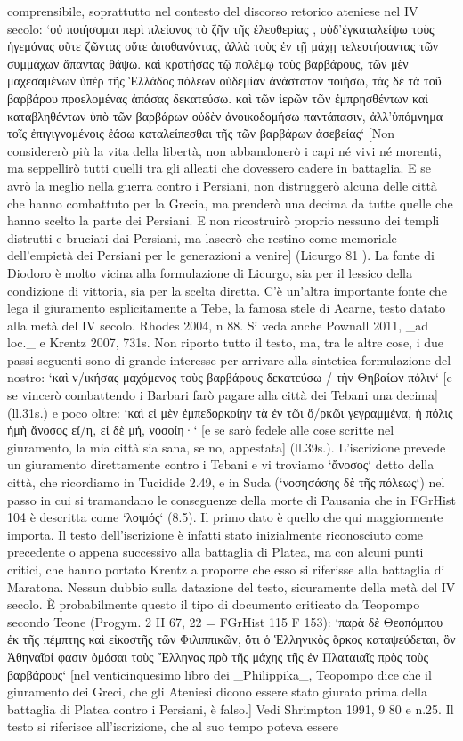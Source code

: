 comprensibile, soprattutto nel contesto del discorso retorico ateniese nel IV secolo: `οὐ ποιήσομαι περὶ πλείονος τὸ ζῆν τῆς ἐλευθερίας , οὐδ’ἐγκαταλείψω τοὺς ἡγεμόνας οὔτε ζῶντας οὔτε ἀποθανόντας, ἀλλὰ τοὺς ἐν τῇ μάχῃ τελευτήσαντας τῶν συμμάχων ἅπαντας θάψω. καὶ κρατήσας τῷ πολέμῳ τοὺς βαρβάρους, τῶν μὲν μαχεσαμένων ὑπὲρ τῆς Ἑλλάδος πόλεων οὑδεμίαν ἀνάστατον ποιήσω, τὰς δὲ τὰ τοῦ βαρβάρου προελομένας ἁπάσας δεκατεύσω. καὶ τῶν ἱερῶν τῶν ἐμπρησθέντων καὶ καταβληθέντων ὑπὸ τῶν βαρβάρων οὐδὲν ἀνοικοδομήσω παντάπασιν, ἀλλ’ὑπόμνημα τοῖς ἐπιγιγνομένοις ἐάσω καταλείπεσθαι τῆς τῶν βαρβάρων ἀσεβείας` [Non considererò più la vita della libertà, non abbandonerò i capi né vivi né morenti, ma seppellirò tutti quelli tra gli alleati che dovessero cadere in battaglia. E se avrò la meglio nella guerra contro i Persiani, non distruggerò alcuna delle città che hanno combattuto per la Grecia, ma prenderò una decima da tutte quelle che hanno scelto la parte dei Persiani. E non ricostruirò proprio nessuno dei templi distrutti e bruciati dai Persiani, ma lascerò che restino come memoriale dell'empietà dei Persiani per le generazioni a venire] (Licurgo 81 ). La fonte di  Diodoro è molto vicina alla formulazione  di Licurgo, sia per il lessico della condizione di vittoria, sia per la scelta diretta. C'è un'altra importante fonte che lega il giuramento esplicitamente a Tebe, la famosa stele di Acarne, testo datato alla metà del IV secolo. Rhodes 2004, n 88. Si veda anche Pownall 2011, _ad loc._ e  Krentz 2007, 731s. Non riporto tutto il testo, ma, tra le altre cose, i due passi seguenti sono di grande interesse per arrivare alla sintetica formulazione del nostro: `καὶ ν/ικήσας μαχόμενος τοὺς βαρβάρους δεκατεύσω / τὴν Θηβαίων πόλιν` [e se vincerò combattendo i Barbari farò  pagare alla città dei Tebani una decima]  (ll.31s.) e poco oltre: `καὶ εἰ μὲν ἐμπεδορκοίην τὰ ἐν τῶι ὅ/ρκῶι γεγραμμένα, ἡ πόλις ἡμὴ ἄνοσος εἴ/η, εἰ δὲ μή, νοσοίη·` [e se sarò fedele alle cose scritte nel giuramento, la mia città sia sana, se no, appestata] (ll.39s.). L'iscrizione prevede un giuramento direttamente contro i Tebani e vi troviamo `ἄνοσος` detto della città, che ricordiamo in Tucidide 2.49, e in Suda (`νοσησάσης δὲ τῆς πόλεως`) nel passo in cui si tramandano le conseguenze della morte di Pausania  che in FGrHist 104 è descritta come `λοιμός` (8.5). Il primo dato è quello che qui maggiormente importa. Il testo dell'iscrizione è infatti stato inizialmente riconosciuto come precedente o appena successivo alla battaglia di Platea, ma con alcuni punti critici, che hanno portato Krentz a proporre che esso si riferisse alla battaglia di Maratona. Nessun dubbio sulla datazione del testo, sicuramente della metà del IV secolo. È probabilmente questo il tipo di documento criticato da Teopompo  secondo Teone (Progym. 2 II 67, 22 = FGrHist 115 F 153): `παρὰ δὲ Θεοπόμπου ἐκ τῆς πέμπτης καὶ εἰκοστῆς τῶν Φιλιππικῶν, ὅτι ὁ Ἑλληνικὸς ὅρκος καταψεύδεται, ὃν Ἀθηναῖοί φασιν ὀμόσαι τοὺς Ἕλληνας πρὸ τῆς μάχης τῆς ἐν Πλαταιαῖς πρὸς τοὺς βαρβάρους` [nel venticinquesimo libro dei _Philippika_, Teopompo dice che il giuramento dei Greci, che gli Ateniesi dicono essere stato giurato prima della battaglia di Platea contro i Persiani, è falso.] Vedi Shrimpton 1991, 9 80 e n.25. Il testo si riferisce all'iscrizione, che al suo tempo poteva essere 